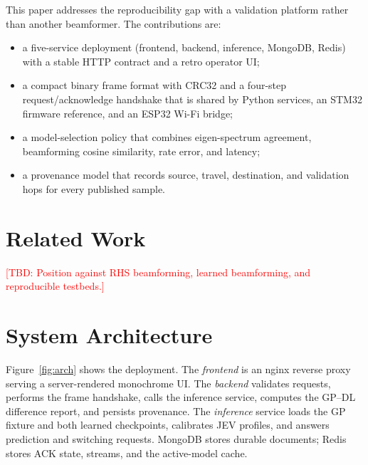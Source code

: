 \documentclass[conference]{IEEEtran}
\newcommand{\tbd}[1]{\textcolor{red}{[TBD: #1]}}
\begin{document}
This paper addresses the reproducibility gap with a validation platform rather
than another beamformer. The contributions are:
\begin{itemize}
  \item a five-service deployment (frontend, backend, inference, MongoDB,
        Redis) with a stable HTTP contract and a retro operator UI;
  \item a compact binary frame format with CRC32 and a four-step
        request/acknowledge handshake that is shared by Python services, an
        STM32 firmware reference, and an ESP32 Wi-Fi bridge;
  \item a model-selection policy that combines eigen-spectrum agreement,
        beamforming cosine similarity, rate error, and latency;
  \item a provenance model that records source, travel, destination, and
        validation hops for every published sample.
\end{itemize}

\section{Related Work}
\tbd{Position against RHS beamforming, learned beamforming, and reproducible
testbeds.}

\section{System Architecture}
Figure~\ref{fig:arch} shows the deployment. The \emph{frontend} is an nginx
reverse proxy serving a server-rendered monochrome UI. The \emph{backend}
validates requests, performs the frame handshake, calls the inference service,
computes the GP--DL difference report, and persists provenance. The
\emph{inference} service loads the GP fixture and both learned checkpoints,
calibrates JEV profiles, and answers prediction and switching requests.
MongoDB stores durable documents; Redis stores ACK state, streams, and the
active-model cache.
\end{document}
